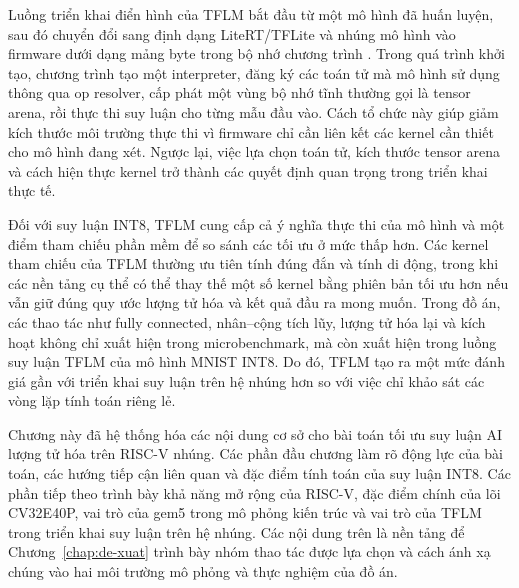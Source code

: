 \documentclass[../DoAn.tex]{subfiles}
\begin{document}
Luồng triển khai điển hình của TFLM bắt đầu từ một mô hình đã huấn luyện, sau đó chuyển đổi sang định dạng LiteRT/TFLite và nhúng mô hình vào firmware dưới dạng mảng byte trong bộ nhớ chương trình \cite{google_litert_micro_2026}. Trong quá trình khởi tạo, chương trình tạo một interpreter, đăng ký các toán tử mà mô hình sử dụng thông qua op resolver, cấp phát một vùng bộ nhớ tĩnh thường gọi là tensor arena, rồi thực thi suy luận cho từng mẫu đầu vào. Cách tổ chức này giúp giảm kích thước môi trường thực thi vì firmware chỉ cần liên kết các kernel cần thiết cho mô hình đang xét. Ngược lại, việc lựa chọn toán tử, kích thước tensor arena và cách hiện thực kernel trở thành các quyết định quan trọng trong triển khai thực tế.

Đối với suy luận INT8, TFLM cung cấp cả ý nghĩa thực thi của mô hình và một điểm tham chiếu phần mềm để so sánh các tối ưu ở mức thấp hơn. Các kernel tham chiếu của TFLM thường ưu tiên tính đúng đắn và tính di động, trong khi các nền tảng cụ thể có thể thay thế một số kernel bằng phiên bản tối ưu hơn nếu vẫn giữ đúng quy ước lượng tử hóa và kết quả đầu ra mong muốn. Trong đồ án, các thao tác như fully connected, nhân--cộng tích lũy, lượng tử hóa lại và kích hoạt không chỉ xuất hiện trong microbenchmark, mà còn xuất hiện trong luồng suy luận TFLM của mô hình MNIST INT8. Do đó, TFLM tạo ra một mức đánh giá gần với triển khai suy luận trên hệ nhúng hơn so với việc chỉ khảo sát các vòng lặp tính toán riêng lẻ.

Chương này đã hệ thống hóa các nội dung cơ sở cho bài toán tối ưu suy luận AI lượng tử hóa trên RISC-V nhúng. Các phần đầu chương làm rõ động lực của bài toán, các hướng tiếp cận liên quan và đặc điểm tính toán của suy luận INT8. Các phần tiếp theo trình bày khả năng mở rộng của RISC-V, đặc điểm chính của lõi CV32E40P, vai trò của gem5 trong mô phỏng kiến trúc và vai trò của TFLM trong triển khai suy luận trên hệ nhúng. Các nội dung trên là nền tảng để Chương~\ref{chap:de-xuat} trình bày nhóm thao tác được lựa chọn và cách ánh xạ chúng vào hai môi trường mô phỏng và thực nghiệm của đồ án.
\end{document}
